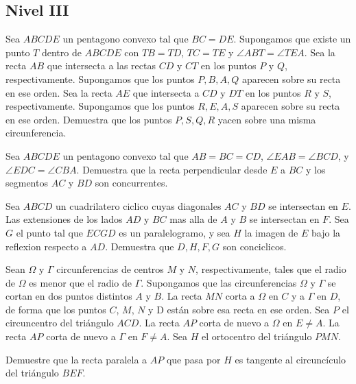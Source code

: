 \documentclass[11pt]{scrartcl}
\begin{document}
\subsection{Nivel III}
\begin{problem} %
Sea $ABCDE$ un pentagono convexo tal que $BC=DE$. Supongamos que existe un punto $T$ dentro de $ABCDE$ con $TB=TD$, $TC=TE$ y $\angle ABT=\angle TEA$. Sea la recta $AB$ que intersecta a las rectas $CD$ y $CT$ en los puntos $P$ y $Q$, respectivamente. Supongamos que los puntos $P,B,A,Q$ aparecen sobre su recta en ese orden. Sea la recta $AE$ que intersecta a $CD$ y $DT$ en los puntos $R$ y $S$, respectivamente. Supongamos que los puntos $R,E,A,S$ aparecen sobre su recta en ese orden. Demuestra que los puntos $P,S,Q,R$ yacen sobre una misma circunferencia.
\end{problem}
\begin{problem} %
    Sea $ABCDE$ un pentagono convexo tal que $AB=BC=CD$, $\angle EAB=\angle BCD$, y $\angle EDC=\angle CBA$. Demuestra que la recta perpendicular desde $E$ a $BC$ y los segmentos $AC$ y $BD$ son concurrentes.
\end{problem}

\begin{problem} %
    Sea $ABCD$ un cuadrilatero ciclico cuyas diagonales $AC$ y $BD$ se intersectan en $E$. Las extensiones de los lados $AD$ y $BC$ mas alla de $A$ y $B$ se intersectan en $F$. Sea $G$ el punto tal que $ECGD$ es un paralelogramo, y sea $H$ la imagen de $E$ bajo la reflexion respecto a $AD$. Demuestra que $D,H,F,G$ son conciclicos.
\end{problem}

\begin{problem} %
    Sean $\Omega$ y $\Gamma$ circunferencias de centros $M$ y $N$, respectivamente, tales que el radio
	de $\Omega$ es menor que el radio de $\Gamma$. Supongamos que las circunferencias $\Omega$ y $\Gamma$
	se cortan en dos puntos distintos $A$ y $B$. La recta $MN$ corta a $\Omega$ en $C$ y a $\Gamma$ en $D$, de forma
	que los puntos $C$, $M$, $N$ y D están sobre esa recta en ese orden. Sea $P$ el circuncentro del triángulo $ACD$.
	La recta $AP$ corta de nuevo a $\Omega$ en $E \neq A$. La recta $AP$ corta de nuevo a $\Gamma$ en $F \neq A$. Sea $H$ el
	ortocentro del triángulo $PMN$.
	
	Demuestre que la recta paralela a $AP$ que pasa por $H$ es tangente al circuncículo del triángulo $BEF$.
	
\end{problem}
\end{document}
